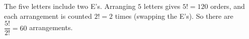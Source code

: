 The five letters include two E's. Arranging $5$ letters gives $5!=120$ orders, and each arrangement is counted $2!=2$ times (swapping the E's). So there are $\dfrac{5!}{2!}=\boxed{60}$ arrangements.
